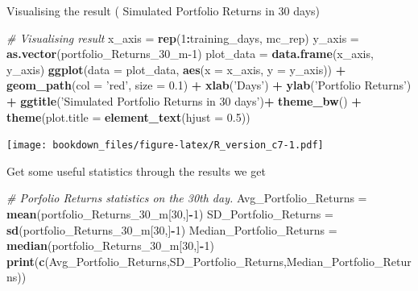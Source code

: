 \documentclass[]{book}
\newenvironment{Shaded}{\begin{snugshade}}{\end{snugshade}}
\newcommand{\CommentTok}[1]{\textcolor[rgb]{0.56,0.35,0.01}{\textit{#1}}}
\newcommand{\DataTypeTok}[1]{\textcolor[rgb]{0.13,0.29,0.53}{#1}}
\newcommand{\DecValTok}[1]{\textcolor[rgb]{0.00,0.00,0.81}{#1}}
\newcommand{\FloatTok}[1]{\textcolor[rgb]{0.00,0.00,0.81}{#1}}
\newcommand{\KeywordTok}[1]{\textcolor[rgb]{0.13,0.29,0.53}{\textbf{#1}}}
\newcommand{\NormalTok}[1]{#1}
\newcommand{\OperatorTok}[1]{\textcolor[rgb]{0.81,0.36,0.00}{\textbf{#1}}}
\newcommand{\StringTok}[1]{\textcolor[rgb]{0.31,0.60,0.02}{#1}}
\begin{document}
Visualising the result ( Simulated Portfolio Returns in 30 days)

\begin{Shaded}
\begin{Highlighting}[]
\CommentTok{# Visualising result}
\NormalTok{x_axis =}\StringTok{ }\KeywordTok{rep}\NormalTok{(}\DecValTok{1}\OperatorTok{:}\NormalTok{training_days, mc_rep)}
\NormalTok{y_axis =}\StringTok{ }\KeywordTok{as.vector}\NormalTok{(portfolio_Returns_}\DecValTok{30}\NormalTok{_m}\DecValTok{-1}\NormalTok{)}
\NormalTok{plot_data =}\StringTok{ }\KeywordTok{data.frame}\NormalTok{(x_axis, y_axis)}
\KeywordTok{ggplot}\NormalTok{(}\DataTypeTok{data =}\NormalTok{ plot_data, }\KeywordTok{aes}\NormalTok{(}\DataTypeTok{x =}\NormalTok{ x_axis, }\DataTypeTok{y =}\NormalTok{ y_axis)) }\OperatorTok{+}\StringTok{ }\KeywordTok{geom_path}\NormalTok{(}\DataTypeTok{col =} \StringTok{'red'}\NormalTok{, }\DataTypeTok{size =} \FloatTok{0.1}\NormalTok{) }\OperatorTok{+}
\StringTok{  }\KeywordTok{xlab}\NormalTok{(}\StringTok{'Days'}\NormalTok{) }\OperatorTok{+}\StringTok{ }\KeywordTok{ylab}\NormalTok{(}\StringTok{'Portfolio Returns'}\NormalTok{) }\OperatorTok{+}\StringTok{ }
\StringTok{  }\KeywordTok{ggtitle}\NormalTok{(}\StringTok{'Simulated Portfolio Returns in 30 days'}\NormalTok{)}\OperatorTok{+}
\StringTok{  }\KeywordTok{theme_bw}\NormalTok{() }\OperatorTok{+}
\StringTok{  }\KeywordTok{theme}\NormalTok{(}\DataTypeTok{plot.title =} \KeywordTok{element_text}\NormalTok{(}\DataTypeTok{hjust =} \FloatTok{0.5}\NormalTok{))}
\end{Highlighting}
\end{Shaded}

\texttt{[image: bookdown\_files/figure-latex/R\_version\_c7-1.pdf]}

Get some useful statistics through the results we get

\begin{Shaded}
\begin{Highlighting}[]
\CommentTok{# Porfolio Returns statistics on the 30th day.}
\NormalTok{Avg_Portfolio_Returns =}\StringTok{ }\KeywordTok{mean}\NormalTok{(portfolio_Returns_}\DecValTok{30}\NormalTok{_m[}\DecValTok{30}\NormalTok{,]}\OperatorTok{-}\DecValTok{1}\NormalTok{)}
\NormalTok{SD_Portfolio_Returns =}\StringTok{ }\KeywordTok{sd}\NormalTok{(portfolio_Returns_}\DecValTok{30}\NormalTok{_m[}\DecValTok{30}\NormalTok{,]}\OperatorTok{-}\DecValTok{1}\NormalTok{)}
\NormalTok{Median_Portfolio_Returns =}\StringTok{ }\KeywordTok{median}\NormalTok{(portfolio_Returns_}\DecValTok{30}\NormalTok{_m[}\DecValTok{30}\NormalTok{,]}\OperatorTok{-}\DecValTok{1}\NormalTok{)}
\KeywordTok{print}\NormalTok{(}\KeywordTok{c}\NormalTok{(Avg_Portfolio_Returns,SD_Portfolio_Returns,Median_Portfolio_Returns))}
\end{Highlighting}
\end{Shaded}
\end{document}

